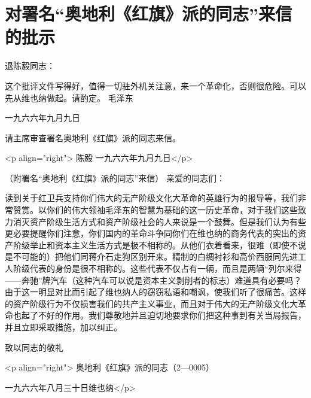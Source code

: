 \section[对署名“奥地利《红旗》派的同志”来信的批示（一九六六年九月九日）]{对署名“奥地利《红旗》派的同志”来信的批示}


退陈毅同志：

这个批评文件写得好，值得一切驻外机关注意，来一个革命化，否则很危险。可以先从维也纳做起。请酌定。
毛泽东
{\raggedleft 一九六六年九月九日\par}

请主席审查署名奥地利《红旗》派的同志来信。

<p align="right"> 陈毅
一九六六年九月九日</p>

（附署名“奥地利《红旗》派的同志”来信）
亲爱的同志们：

读到关于红卫兵支持你们伟大的无产阶级文化大革命的英雄行为的报导等，我们非常赞赏。以你们的伟大领袖毛泽东的智慧为基础的这一历史革命，对于我们这些致力消灭资产阶级生活方式和资产阶级社会的人来说是一个鼓舞。但是我们认为有些更必要提醒你们注意，你们国内的革命斗争同你们在维也纳的商务代表的突出的资产阶级举止和资本主义生活方式是极不相称的。从他们衣着看来，很难（即使不说是不可能的）把他们同蒋介石走狗区别开来。精制的白绸衬衫和高价西服同先进工人阶级代表的身份是很不相称的。这些代表不仅占有一辆，而且是两辆“列尔来得——奔驰”牌汽车（这种汽车可以说是资本主义剥削者的标志）难道具有必要吗？由于这一明显对比而引起了维也纳人的窃窃私语和嘲讽，使我们听了很痛苦。这样的资产阶级行为不仅损害我们的共产主义事业，而且对于伟大的无产阶级文化大革命也起了不好的作用。我们尊敬地并且迫切地要求你们把这种事到有关当局报告，并且立即采取措施，加以纠正。

致以同志的敬礼

<p align="right"> 奥地利《红旗》派的同志（2—0005）

 一九六六年八月三十日维也纳</p>


